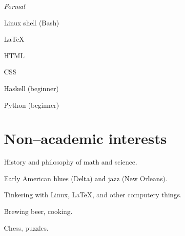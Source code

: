 \documentclass[11pt,letterpaper]{article}
\newcommand{\cvitem}[2]{%
  \begin{minipage}[t]{0.24\textwidth}
    #1 %
  \end{minipage}
  \hfill
  \begin{minipage}[t]{0.74\textwidth}
    #2 %
  \end{minipage}
}
\renewenvironment{itemize}{%
  \begin{list}{}{%
    \setlength{\itemsep}{0.5em}
    \setlength{\leftmargin}{0em}
  }
}{%
  \end{list}
}
\begin{document}
\cvitem{\textit{Formal}}{%
  \begin{itemize}
    \item Linux shell (Bash)
    \item \LaTeX{}
    \item HTML
    \item CSS
    \item Haskell \hfill (beginner)
    \item Python \hfill (beginner)
  \end{itemize}
}



\section*{Non--academic interests}
\begin{description}
  \item History and philosophy of math and science.
  \item Early American blues (Delta) and jazz (New Orleans).
  \item Tinkering with Linux, \LaTeX{}, and other computery things.
  \item Brewing beer, cooking.
  \item Chess, puzzles.
\end{description}
\end{document}
